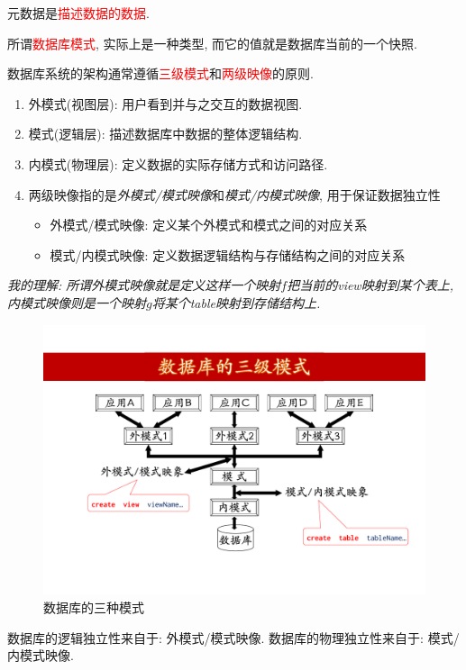 \begin{definition}
元数据是\textcolor{red}{描述数据的数据}.
\end{definition}

所谓\textcolor{red}{数据库模式}, 实际上是一种类型, 而它的值就是数据库当前的一个快照.

数据库系统的架构通常遵循\textcolor{red}{三级模式}和\textcolor{red}{两级映像}的原则.
\begin{enumerate}
    \item 外模式(视图层): 用户看到并与之交互的数据视图.
    \item 模式(逻辑层): 描述数据库中数据的整体逻辑结构.
    \item 内模式(物理层): 定义数据的实际存储方式和访问路径.
    \item 两级映像指的是\textit{外模式/模式映像}和\textit{模式/内模式映像}, 用于保证数据独立性
    \begin{itemize}
        \item 外模式/模式映像: 定义某个外模式和模式之间的对应关系
        \item 模式/内模式映像: 定义数据逻辑结构与存储结构之间的对应关系
    \end{itemize}
\end{enumerate}

\textit{我的理解: 所谓外模式映像就是定义这样一个映射$f$把当前的view映射到某个表上, 内模式映像则是一个映射$g$将某个table映射到存储结构上.}

\begin{figure}[H]
    \centering
    \includegraphics[width=.6\textwidth]{figure/db-6.pdf}
    \caption{数据库的三种模式}
\end{figure}

\begin{remark}
    数据库的逻辑独立性来自于: 外模式/模式映像. 数据库的物理独立性来自于: 模式/内模式映像.
\end{remark}

